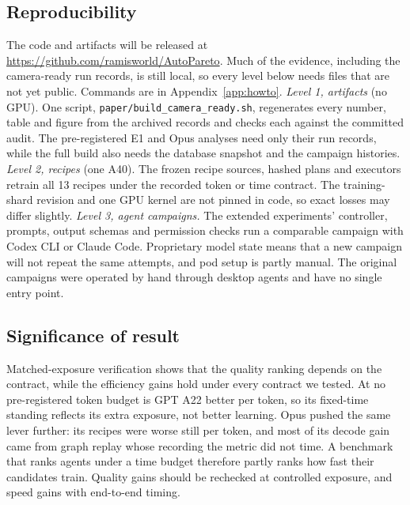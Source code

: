 \documentclass{article}
\newif\ifshowhumanmarkers \showhumanmarkersfalse
\newcommand{\humantag}[1]{{\color{humanframe}\sffamily\scriptsize\bfseries HUMAN AUTHOR MUST REWRITE/VERIFY [#1]}\ }
\newcommand{\humanauthor}[2][]{\ifshowhumanmarkers\begin{humanbox}\humantag{#1}#2\end{humanbox}\else #2\par\fi}
\begin{document}
\subsection{Reproducibility}\label{sec:reproduce}
\humanauthor[P2-17 r6]{ The code and artifacts will be released at \url{https://github.com/ramisworld/AutoPareto}. Much of the evidence, including the camera-ready run records, is still local, so every level below needs files that are not yet public. Commands are in Appendix~\ref{app:howto}. \emph{Level 1, artifacts} (no GPU). One script, \texttt{paper/build\_camera\_ready.sh}, regenerates every number, table and figure from the archived records and checks each against the committed audit. The pre-registered E1 and Opus analyses need only their run records, while the full build also needs the database snapshot and the campaign histories. \emph{Level 2, recipes} (one A40). The frozen recipe sources, hashed plans and executors retrain all 13 recipes under the recorded token or time contract. The training-shard revision and one GPU kernel are not pinned in code, so exact losses may differ slightly. \emph{Level 3, agent campaigns.} The extended experiments' controller, prompts, output schemas and permission checks run a comparable campaign with Codex CLI or Claude Code. Proprietary model state means that a new campaign will not repeat the same attempts, and pod setup is partly manual. The original campaigns were operated by hand through desktop agents and have no single entry point.}

\subsection{Significance of result}
\humanauthor[P2-12 r6]{ Matched-exposure verification shows that the quality ranking depends on the contract, while the efficiency gains hold under every contract we tested. At no pre-registered token budget is GPT A22 better per token, so its fixed-time standing reflects its extra exposure, not better learning. Opus pushed the same lever further: its recipes were worse still per token, and most of its decode gain came from graph replay whose recording the metric did not time. A benchmark that ranks agents under a time budget therefore partly ranks how fast their candidates train. Quality gains should be rechecked at controlled exposure, and speed gains with end-to-end timing.}
\end{document}

